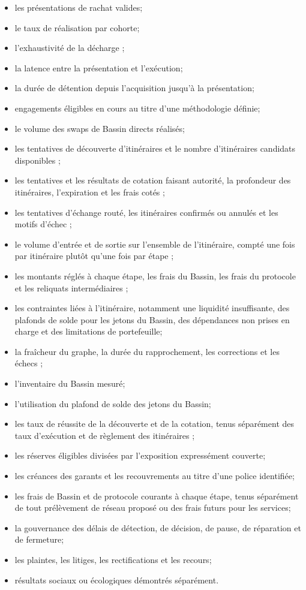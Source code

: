 \documentclass[11pt]{article}
\begin{document}
\begin{itemize}[leftmargin=*]
\item les présentations de rachat valides;
\item le taux de réalisation par cohorte;
\item l'exhaustivité de la décharge ;
\item la latence entre la présentation et l'exécution;
\item la durée de détention depuis l'acquisition jusqu'à la présentation;
\item engagements éligibles en cours au titre d'une méthodologie définie;
\item le volume des swaps de Bassin directs réalisés;
\item les tentatives de découverte d'itinéraires et le nombre d'itinéraires candidats disponibles ;
\item les tentatives et les résultats de cotation faisant autorité, la profondeur des itinéraires, l'expiration et les frais cotés ;
\item les tentatives d'échange routé, les itinéraires confirmés ou annulés et les motifs d'échec ;
\item le volume d'entrée et de sortie sur l'ensemble de l'itinéraire, compté une fois par itinéraire plutôt qu'une fois par étape ;
\item les montants réglés à chaque étape, les frais du Bassin, les frais du protocole et les reliquats intermédiaires ;
\item les contraintes liées à l'itinéraire, notamment une liquidité insuffisante, des plafonds de solde pour les jetons du Bassin, des dépendances non prises en charge et des limitations de portefeuille;
\item la fraîcheur du graphe, la durée du rapprochement, les corrections et les échecs ;
\item l'inventaire du Bassin mesuré;
\item l'utilisation du plafond de solde des jetons du Bassin;
\item les taux de réussite de la découverte et de la cotation, tenus séparément des taux d'exécution et de règlement des itinéraires ;
\item les réserves éligibles divisées par l'exposition expressément couverte;
\item les créances des garants et les recouvrements au titre d'une police identifiée;
\item les frais de Bassin et de protocole courants à chaque étape, tenus séparément de tout prélèvement de réseau proposé ou des frais futurs pour les services;
\item la gouvernance des délais de détection, de décision, de pause, de réparation et de fermeture;
\item les plaintes, les litiges, les rectifications et les recours;
\item résultats sociaux ou écologiques démontrés séparément.
\end{itemize}
\end{document}
